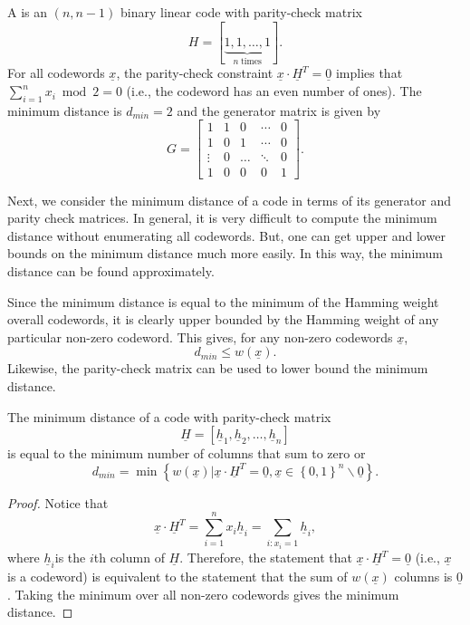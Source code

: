 \begin{example}
A  is an $(n,n-1)$ binary linear code with parity-check matrix
\[ H=[\underbrace{1,1,\ldots,1}_{n\;\mathrm{times}}]. \]
For all codewords $\underline{x}$, the parity-check constraint $\underline{x}\cdot\underline{H}^{T}=\underline{0}$ implies that $\sum_{i=1}^{n}x_{i}\bmod2=0$ (i.e., the codeword has an even number of ones).
The minimum distance is $d_{min} = 2$ and the generator matrix is given by
\begin{equation*}
G=\left[\begin{array}{ccccc} 1 & 1 & 0 & \cdots & 0 \\ 1 & 0 & 1 & \cdots & 0 \\ \vdots & 0 & \ldots & \ddots & 0 \\ 1 & 0 & 0 & 0 & 1 \end{array}\right].
\end{equation*}
\end{example}

Next, we consider the minimum distance of a code in terms of its generator and parity check matrices.
In general, it is very difficult to compute the minimum distance without enumerating all codewords.
But, one can get upper and lower bounds on the minimum distance much more easily.
In this way, the minimum distance can be found approximately.

Since the minimum distance is equal to the minimum of the Hamming weight overall codewords, it is clearly upper bounded by the Hamming weight of any particular non-zero codeword.
This gives, for any non-zero codewords $\underline{x}$,
\[ d_{min} \leq w(\underline{x}). \]
Likewise, the parity-check matrix can be used to lower bound the minimum distance.
\begin{proposition}
The minimum distance of a code with parity-check matrix
\[\underline{H}=\left[\underline{h}_{1},\underline{h}_{2},\ldots,\underline{h}_{n}\right] \]
is equal to the minimum number of columns that sum to zero or
\[ d_{min}=\min\left\{ w(\underline{x})|\underline{x}\cdot\underline{H}^{T}=\underline{0},\underline{x}\in\left\{ 0,1\right\} ^{n}\backslash\underline{0}\right\}. \]
\end{proposition}
\begin{proof}
Notice that
\[ \underline{x}\cdot\underline{H}^{T}=\sum_{i=1}^n x_{i}\underline{h}_{i}=\sum_{i:x_{i}=1}\underline{h}_{i}, \]
where $\underline{h}_{i}$is the $i$th column of $\underline{H}$.
Therefore, the statement that $\underline{x}\cdot\underline{H}^{T}=\underline{0}$ (i.e., $\underline{x}$ is a codeword) is equivalent to the statement that the sum of $w(\underline{x})$ columns is $\underline{0}$.
Taking the minimum over all non-zero codewords gives the minimum distance.
\end{proof}

